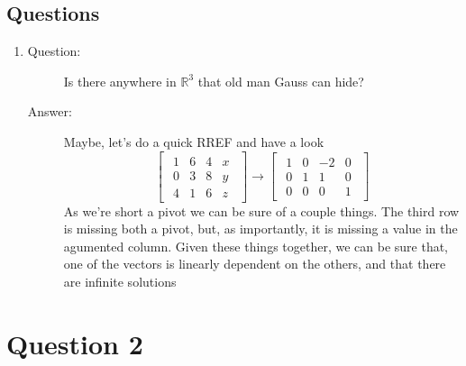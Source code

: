 \documentclass{article}
\begin{document}
        \subsection{Questions}
            \renewcommand{\labelenumi}{\alph{enumi}}
            \begin{enumerate}
                \item
                    \begin{description}
                        \item[Question:]Is there anywhere in $\mathbb{R}^3$ that old man Gauss can hide?
                        \item[Answer:]
                            Maybe, let's do a quick RREF and have a look
                            \[
                            \begin{bmatrix}
                            \begin{array}{ccc|c}
                                1 & 6 &  4 & x \\
                                0 & 3 &  8 & y \\
                                4 & 1 &  6 & z
                            \end{array}
                            \end{bmatrix}
                            \rightarrow
                            \begin{bmatrix}
                            \begin{array}{ccc|c}
                                1 & 0 & -2 & 0 \\
                                0 & 1 &  1 & 0 \\
                                0 & 0 &  0 & 1
                            \end{array}
                            \end{bmatrix}
                            \]
                            As we're short a pivot we can be sure of a couple things.
                            The third row is missing both a pivot, but, as importantly,
                            it is missing a value in the agumented column.
                            Given these things together, we can be sure that, one of the vectors is 
                            linearly dependent on the others, and that there are infinite solutions
                    \end{description}
            \end{enumerate}
            \section{Question 2}
\end{document}
